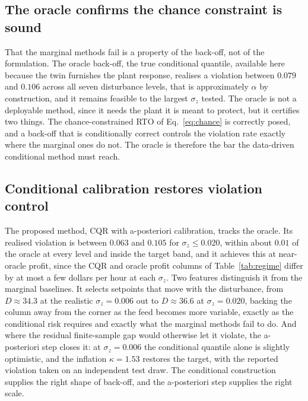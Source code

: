 \subsection{The oracle confirms the chance constraint is sound}
\label{sec:results-oracle}

That the marginal methods fail is a property of the back-off, not of the formulation. The
oracle back-off, the true conditional quantile, available here because the twin furnishes the
plant response, realises a violation between $0.079$ and $0.106$ across all seven disturbance
levels, that is approximately $\alpha$ by construction, and it remains feasible to the largest
$\sigma_z$ tested. The oracle is not a deployable method, since it needs the plant it is meant
to protect, but it certifies two things. The chance-constrained RTO of Eq.~\eqref{eq:chance} is
correctly posed, and a back-off that is conditionally correct controls the violation rate
exactly where the marginal ones do not. The oracle is therefore the bar the data-driven
conditional method must reach.

\subsection{Conditional calibration restores violation control}
\label{sec:results-fix}

The proposed method, CQR with a-posteriori calibration, tracks the oracle. Its realised
violation is between $0.063$ and $0.105$ for $\sigma_z\le0.020$, within about $0.01$ of the
oracle at every level and inside the target band, and it achieves this at near-oracle profit,
since the CQR and oracle profit columns of Table~\ref{tab:regime} differ by at most a few
dollars per hour at each $\sigma_z$. Two features distinguish it from the marginal baselines.
It selects setpoints that move with the disturbance, from $D\approx34.3$ at the realistic
$\sigma_z=0.006$ out to $D\approx36.6$ at $\sigma_z=0.020$, backing the column away from the
corner as the feed becomes more variable, exactly as the conditional risk requires and exactly
what the marginal methods fail to do. And where the residual finite-sample gap would otherwise
let it violate, the a-posteriori step closes it: at $\sigma_z=0.006$ the conditional quantile
alone is slightly optimistic, and the inflation $\kappa=1.53$ restores the target, with the
reported violation taken on an independent test draw. The conditional construction supplies the
right shape of back-off, and the a-posteriori step supplies the right scale.


